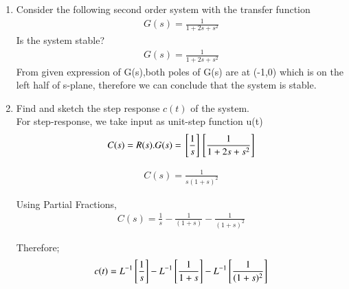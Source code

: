 \begin{enumerate}[label=\thesection.\arabic*.,ref=\thesection.\theenumi]
\item
Consider the following second order system with the transfer function
\begin{align}
G(s) = \frac{1}{1+2s+s^2}
\end{align}
Is the system stable? 
\\
\solution 
\begin{align}
G(s) = \frac{1}{1+2s+s^2}
\end{align}
From given expression of G(s),both poles of G(s) are at (-1,0) which is on the left half of s-plane, therefore we can conclude that the system is stable.
\item Find and sketch the step response $c(t)$ of the system.
\\
\solution 
For step-response, we take input as unit-step function u(t)
\begin{align}
C(s) = R(s).G(s) = {}\left[\frac{1}{s}\right] {}\left[\frac{1}{1+2s+s^2}\right]
\end{align}

\begin{align}
C(s) =  \frac{1}{s(1+s)^2}
\end{align}



Using Partial Fractions,
\begin{align}
C(s) = \frac{1}{s} - \frac{1}{(1+s)} - \frac{1}{(1+s)^2}
\end{align}


Therefore;
\begin{align}
c(t) = L^{-1} {}\left[ \frac{1}{s}\right] - L^{-1}{}\left[\frac{1}{1+s}\right] - L^{-1}{}\left[\frac{1}{(1+s)^2}\right] 
\end{align}


\end{enumerate}

